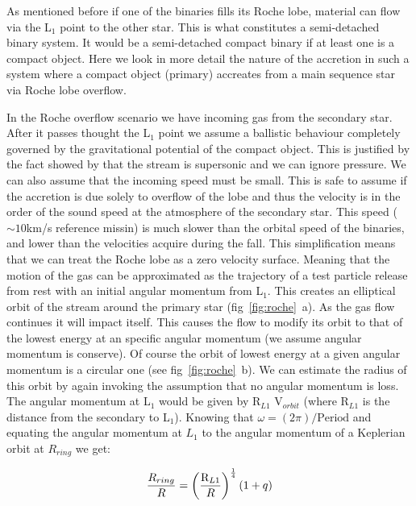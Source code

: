 As mentioned before if one of the binaries fills its Roche lobe, material can flow via the L$_1$ point to the other star. This is what constitutes a semi-detached binary system. It would be a semi-detached compact binary if at least one is a compact object. Here we look in more detail the nature of the accretion in such a system where a compact object (primary) accreates from a main sequence star via Roche lobe overflow. 

In the Roche overflow scenario we have incoming gas from the secondary star. After it passes thought the L$_1$ point we assume a ballistic behaviour completely governed by the gravitational potential of the compact object. This is justified by the fact showed by \citep{lubow_gas_1975} that the stream is supersonic and we can ignore pressure. We can also assume that the incoming speed must be small. This is safe to assume if the accretion is due solely to overflow of the lobe and thus the velocity is in the order of the sound speed at the atmosphere of the secondary star. This speed ($\sim 10 $km/s reference missin) is much slower than the orbital speed of the binaries,  and lower than the velocities acquire during the fall. This simplification means that we can treat the Roche lobe as a zero velocity surface. Meaning that the motion of the gas can be approximated as the trajectory of a test particle release from rest with an initial angular momentum from L$_1$. This creates an elliptical orbit of the stream around the primary star (fig~\ref{fig:roche}~a). As the gas flow continues it will impact itself. This causes the flow to modify its orbit to that of the lowest energy at an specific angular momentum (we assume angular momentum is conserve). Of course the orbit of lowest energy at a given angular momentum is a circular one (see fig~\ref{fig:roche}~b). We can estimate the radius of this orbit by again invoking the assumption that no angular momentum is loss. The angular momentum at L$_1$ would be given by  R$_{L1}$  V$_{orbit}$ (where R$_{L1}$ is the distance from the secondary to L$_1$). Knowing that $\omega = (2 \pi)/\text{Period}$ and equating the angular momentum at $L_1$ to the angular momentum of a Keplerian orbit at $R_{ring}$ we get:


\begin{equation}
        \frac{R_{ring}}{R} = \left ( \frac{\text R _{L1}}{R} \right ) ^{\frac{1}{4}} (1+q)
\end{equation}

